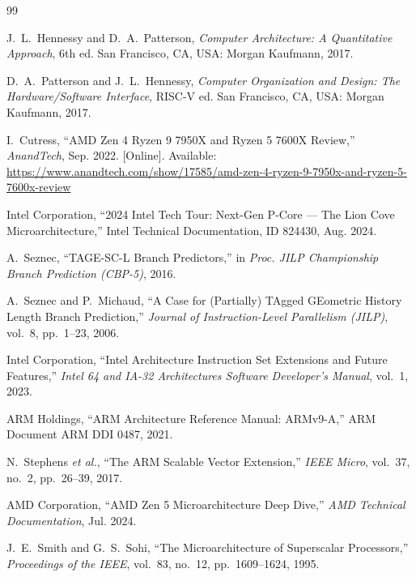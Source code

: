 \documentclass[12pt,a4paper]{IEEEtran}
\begin{document}
\begin{thebibliography}{99}

J.~L.~Hennessy and D.~A.~Patterson,
\textit{Computer Architecture: A Quantitative Approach}, 6th ed.
San Francisco, CA, USA: Morgan Kaufmann, 2017.

D.~A.~Patterson and J.~L.~Hennessy,
\textit{Computer Organization and Design: The Hardware/Software Interface}, RISC-V ed.
San Francisco, CA, USA: Morgan Kaufmann, 2017.

I.~Cutress,
``AMD Zen 4 Ryzen 9 7950X and Ryzen 5 7600X Review,''
\textit{AnandTech}, Sep. 2022. [Online].
Available: \url{https://www.anandtech.com/show/17585/amd-zen-4-ryzen-9-7950x-and-ryzen-5-7600x-review}

Intel Corporation,
``2024 Intel Tech Tour: Next-Gen P-Core — The Lion Cove Microarchitecture,''
Intel Technical Documentation, ID 824430, Aug. 2024.

A.~Seznec,
``TAGE-SC-L Branch Predictors,''
in \textit{Proc. JILP Championship Branch Prediction (CBP-5)}, 2016.

A.~Seznec and P.~Michaud,
``A Case for (Partially) TAgged GEometric History Length Branch Prediction,''
\textit{Journal of Instruction-Level Parallelism (JILP)}, vol.~8, pp.~1--23, 2006.

Intel Corporation,
``Intel Architecture Instruction Set Extensions and Future Features,''
\textit{Intel 64 and IA-32 Architectures Software Developer's Manual}, vol.~1, 2023.

ARM Holdings,
``ARM Architecture Reference Manual: ARMv9-A,''
ARM Document ARM DDI 0487, 2021.

N.~Stephens \textit{et al.},
``The ARM Scalable Vector Extension,''
\textit{IEEE Micro}, vol.~37, no.~2, pp.~26--39, 2017.

AMD Corporation,
``AMD Zen 5 Microarchitecture Deep Dive,''
\textit{AMD Technical Documentation}, Jul. 2024.

J.~E.~Smith and G.~S.~Sohi,
``The Microarchitecture of Superscalar Processors,''
\textit{Proceedings of the IEEE}, vol.~83, no.~12, pp.~1609--1624, 1995.


\end{thebibliography}
\end{document}
